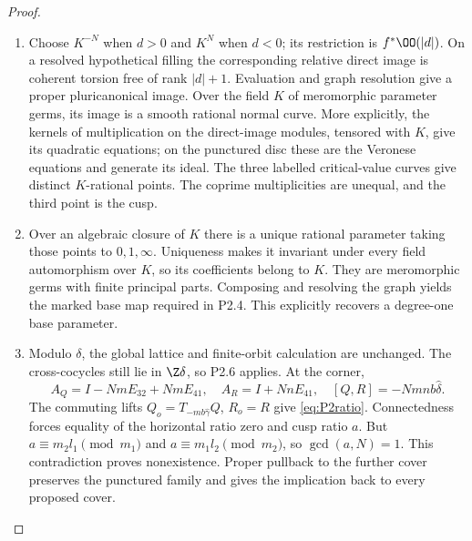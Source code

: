 \begin{proof}
\begin{enumerate}[label=\arabic*.,leftmargin=*]
\item Choose $K^{-N}$ when $d>0$ and $K^N$ when $d<0$; its restriction is $f^*\OO(|d|)$. On a resolved hypothetical filling the corresponding relative direct image is coherent torsion free of rank $|d|+1$. Evaluation and graph resolution give a proper pluricanonical image. Over the field $K$ of meromorphic parameter germs, its image is a smooth rational normal curve. More explicitly, the kernels of multiplication on the direct-image modules, tensored with $K$, give its quadratic equations; on the punctured disc these are the Veronese equations and generate its ideal. The three labelled critical-value curves give distinct $K$-rational points. The coprime multiplicities are unequal, and the third point is the cusp.

\item Over an algebraic closure of $K$ there is a unique rational parameter taking those points to $0,1,\infty$. Uniqueness makes it invariant under every field automorphism over $K$, so its coefficients belong to $K$. They are meromorphic germs with finite principal parts. Composing and resolving the graph yields the marked base map required in P2.4. This explicitly recovers a degree-one base parameter.

\item Modulo $\delta$, the global lattice and finite-orbit calculation are unchanged. The cross-cocycles still lie in $\Z\delta$, so P2.6 applies. At the corner,
\[
 A_Q=I-NmE_{32}+NmE_{41},\quad A_R=I+NnE_{41},\quad [Q,R]=-Nmnb\widehat\delta.
\]
The commuting lifts $Q_o=T_{-mb\widehat\gamma}Q$, $R_o=R$ give \eqref{eq:P2ratio}. Connectedness forces equality of the horizontal ratio zero and cusp ratio $a$. But $a\equiv m_2l_1\pmod{m_1}$ and $a\equiv m_1l_2\pmod{m_2}$, so $\gcd(a,N)=1$. This contradiction proves nonexistence. Proper pullback to the further cover preserves the punctured family and gives the implication back to every proposed cover.
\end{enumerate}
\end{proof}

